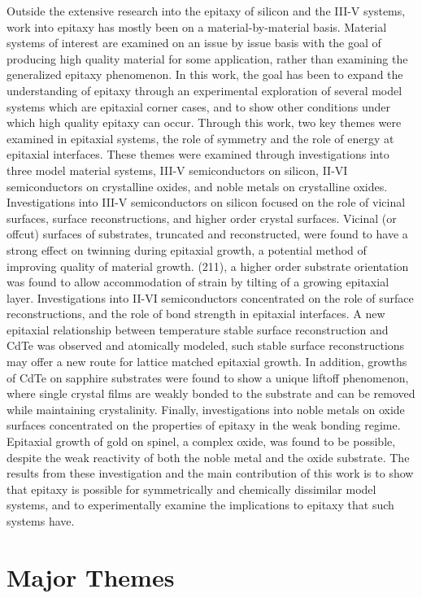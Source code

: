 Outside the extensive research into the epitaxy of silicon and the III-V systems, work into epitaxy has mostly been on a material-by-material basis.
Material systems of interest are examined on an issue by issue basis with the goal of producing high quality material for some application, rather than examining the generalized epitaxy phenomenon.
In this work, the goal has been to expand the understanding of epitaxy through an experimental exploration of several model systems which are epitaxial corner cases, and to show other conditions under which high quality epitaxy can occur.
Through this work, two key themes were examined in epitaxial systems, the role of symmetry and the role of energy at epitaxial interfaces.
These themes were examined through investigations into three model material systems, III-V semiconductors on silicon, II-VI semiconductors on crystalline oxides, and noble metals on crystalline oxides.
Investigations into III-V semiconductors on silicon focused on the role of vicinal surfaces, surface reconstructions, and higher order crystal surfaces. Vicinal (or offcut) surfaces of substrates, truncated and reconstructed, were found to have a strong effect on twinning during epitaxial growth, a potential method of improving quality of material growth. (211), a higher order substrate orientation was found to allow accommodation of strain by tilting of a growing epitaxial layer.
Investigations into II-VI semiconductors concentrated on the role of surface reconstructions, and the role of bond strength in epitaxial interfaces. A new epitaxial relationship between temperature stable surface reconstruction and CdTe was observed and atomically modeled, such stable surface reconstructions may offer a new route for lattice matched epitaxial growth. In addition, growths of CdTe on sapphire substrates were found to show a unique liftoff phenomenon, where single crystal films are weakly bonded to the substrate and can be removed while maintaining crystalinity.
Finally, investigations into noble metals on oxide surfaces concentrated on the properties of epitaxy in the weak bonding regime. Epitaxial growth of gold on spinel, a complex oxide, was found to be possible, despite the weak reactivity of both the noble metal and the oxide substrate.
The results from these investigation and the main contribution of this work is to show that epitaxy is possible for symmetrically and chemically dissimilar model systems, and to experimentally examine the implications to epitaxy that such systems have.

\section{Major Themes}
